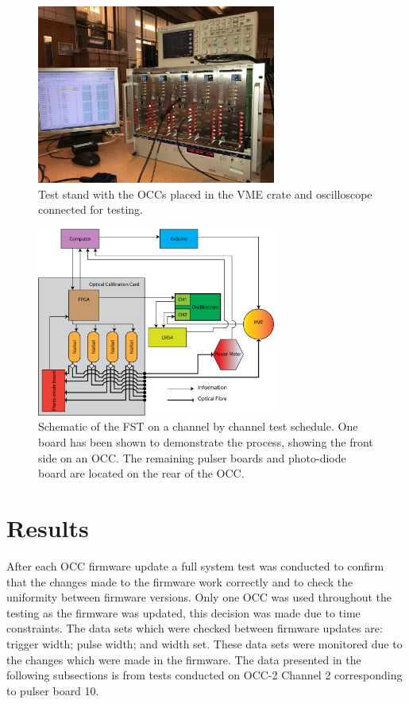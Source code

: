 \begin{figure}[h]
    \centering
    \includegraphics[width=0.7\textwidth]{Figures/TestStand.png}
    \caption{Test stand with the OCCs placed in the VME crate and oscilloscope connected for testing.}
    \label{fig:TestStand}
\end{figure}

\begin{figure}[h!]
    \centering
    \includegraphics[width=0.7\textwidth]{Figures/FST.png}
    \caption{Schematic of the FST on a channel by channel test schedule. One board has been shown to demonstrate the process, showing the front side on an OCC. The remaining pulser boards and photo-diode board are located on the rear of the OCC.}
    \label{fig:FST_Flow}
\end{figure}

\section{Results}
After each OCC firmware update a full system test was conducted to confirm that the changes made to the firmware work correctly and to check the uniformity between firmware versions. Only one OCC was used throughout the testing as the firmware was updated, this decision was made due to time constraints. The data sets which were checked between firmware updates are: trigger width; pulse width; and width set. These data sets were monitored due to the changes which were made in the firmware. The data presented in the following subsections is from tests conducted on OCC-2 Channel 2 corresponding to pulser board 10.
